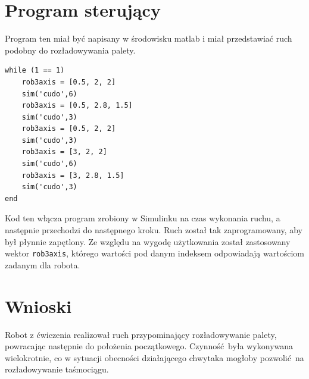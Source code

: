 \documentclass[a4paper, 12pt, titlepage]{article}
\begin{document}
	\section{Program sterujący}
		Program ten miał być napisany w środowisku matlab i miał przedstawiać ruch podobny do rozładowywania palety.
\lstset{language=Matlab} 
\begin{lstlisting}[frame=single, keepspaces=true] 
while (1 == 1)
    rob3axis = [0.5, 2, 2]
    sim('cudo',6)
    rob3axis = [0.5, 2.8, 1.5]
    sim('cudo',3)
    rob3axis = [0.5, 2, 2] 
    sim('cudo',3)
    rob3axis = [3, 2, 2]
    sim('cudo',6)
    rob3axis = [3, 2.8, 1.5]
    sim('cudo',3)
end
\end{lstlisting}
		Kod ten włącza program zrobiony w Simulinku na czas wykonania ruchu, a następnie przechodzi do następnego kroku. Ruch został tak zaprogramowany, aby był płynnie zapętlony. Ze względu na wygodę użytkowania został zastosowany wektor \texttt{rob3axis}, którego wartości pod danym indeksem odpowiadają wartościom zadanym dla robota.
	\section{Wnioski}
		Robot z ćwiczenia realizował ruch przypominający rozładowywanie palety, powracając następnie do położenia początkowego. Czynność była wykonywana wielokrotnie, co w sytuacji obecności działającego chwytaka mogłoby pozwolić na rozładowywanie taśmociągu.
\end{document}

